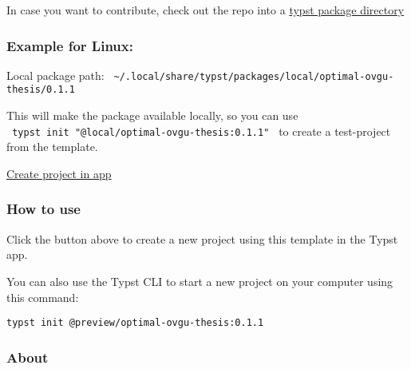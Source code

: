 In case you want to contribute, check out the repo into a
\href{https://github.com/typst/packages?tab=readme-ov-file\#local-packages}{typst
package directory}

\subsubsection{Example for Linux:}\label{example-for-linux}

Local package path:
\texttt{\ \textasciitilde{}/.local/share/typst/packages/local/optimal-ovgu-thesis/0.1.1\ }

\begin{Shaded}
\begin{Highlighting}[]
 
\end{Highlighting}
\end{Shaded}

This will make the package available locally, so you can use
\texttt{\ typst\ init\ "@local/optimal-ovgu-thesis:0.1.1"\ } to create a
test-project from the template.

\href{/app?template=optimal-ovgu-thesis&version=0.1.1}{Create project in
app}

\subsubsection{How to use}\label{how-to-use}

Click the button above to create a new project using this template in
the Typst app.

You can also use the Typst CLI to start a new project on your computer
using this command:

\begin{verbatim}
typst init @preview/optimal-ovgu-thesis:0.1.1
\end{verbatim}



\subsubsection{About}\label{about}

